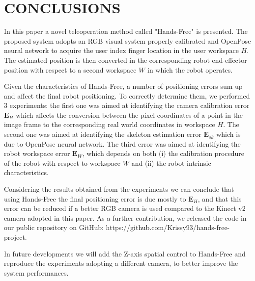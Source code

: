 \documentclass[a4paper, 10 pt, conference]{ieeeconf}      %
\begin{document}
\section{CONCLUSIONS}

In this paper a novel teleoperation method called "Hands-Free" is presented. The proposed system adopts an RGB visual system properly calibrated and OpenPose neural network to acquire the user index finger location in the user workspace $H$. The estimated position is then converted in the corresponding robot end-effector position with respect to a second workspace $W$ in which the robot operates.

Given the characteristics of Hands-Free, a number of positioning errors sum up and affect the final robot positioning. To correctly determine them, we performed 3 experiments: the first one was aimed at identifying the camera calibration error $\mathbf{E}_{H}$ which affects the conversion between the pixel coordinates of a point in the image frame to the corresponding real world coordinates in workspace $H$. The second one was aimed at identifying the skeleton estimation error $\mathbf{E}_{sk}$ which is due to OpenPose neural network. The third error was aimed at identifying the robot workspace error $\mathbf{E}_{W}$, which depends on both (i) the calibration procedure of the robot with respect to workspace $W$ and (ii) the robot intrinsic characteristics.

Considering the results obtained from the experiments we can conclude that using Hands-Free the final positioning error is due mostly to $\mathbf{E}_{H}$, and that this error can be reduced if a better RGB camera is used compared to the Kinect v2 camera adopted in this paper.
As a further contribution, we released the code in our public repository on GitHub: https://github.com/Krissy93/hands-free-project.

In future developments we will add the Z-axis spatial control to Hands-Free and reproduce the experiments adopting a different camera, to better improve the system performances.

\addtolength{\textheight}{-12cm}   %



\end{document}
